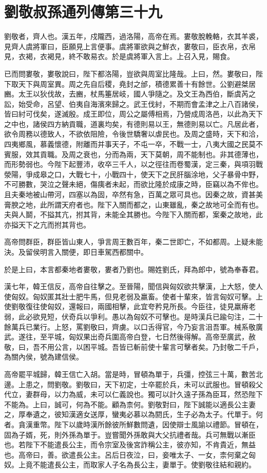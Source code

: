 \chapter{劉敬叔孫通列傳第三十九}

劉敬者，齊人也。漢五年，戍隴西，過洛陽，高帝在焉。婁敬脫輓輅，衣其羊裘，見齊人虞將軍曰，臣願見上言便事。虞將軍欲與之鮮衣，婁敬曰，臣衣帛，衣帛見，衣褐，衣褐見，終不敢易衣。於是虞將軍入言上。上召入見，賜食。

已而問婁敬，婁敬說曰，陛下都洛陽，豈欲與周室比隆哉。上曰，然。婁敬曰，陛下取天下與周室異。周之先自后稷，堯封之邰，積德累善十有餘世。公劉避桀居豳。太王以狄伐故，去豳，杖馬箠居岐，國人爭隨之。及文王為西伯，斷虞芮之訟，始受命，呂望、伯夷自海濱來歸之。武王伐紂，不期而會孟津之上八百諸侯，皆曰紂可伐矣，遂滅殷。成王即位，周公之屬傅相焉，乃營成周洛邑，以此為天下之中也，諸侯四方納貢職，道裏均矣，有德則易以王，無德則易以亡。凡居此者，欲令周務以德致人，不欲依阻險，令後世驕奢以虐民也。及周之盛時，天下和洽，四夷鄉風，慕義懷德，附離而并事天子，不屯一卒，不戰一士，八夷大國之民莫不賓服，效其貢職。及周之衰也，分而為兩，天下莫朝，周不能制也。非其德薄也，而形勢弱也。今陛下起豐沛，收卒三千人，以之徑往而卷蜀漢，定三秦，與項羽戰滎陽，爭成皋之口，大戰七十，小戰四十，使天下之民肝腦涂地，父子暴骨中野，不可勝數，哭泣之聲未絕，傷痍者未起，而欲比隆於成康之時，臣竊以為不侔也。且夫秦地被山帶河，四塞以為固，卒然有急，百萬之眾可具也。因秦之故，資甚美膏腴之地，此所謂天府者也。陛下入關而都之，山東雖亂，秦之故地可全而有也。夫與人鬬，不搤其亢，拊其背，未能全其勝也。今陛下入關而都，案秦之故地，此亦搤天下之亢而拊其背也。

高帝問群臣，群臣皆山東人，爭言周王數百年，秦二世即亡，不如都周。上疑未能決。及留侯明言入關便，即日車駕西都關中。

於是上曰，本言都秦地者婁敬，婁者乃劉也。賜姓劉氏，拜為郎中，號為奉春君。

漢七年，韓王信反，高帝自往擊之。至晉陽，聞信與匈奴欲共擊漢，上大怒，使人使匈奴。匈奴匿其壯士肥牛馬，但見老弱及羸畜。使者十輩來，皆言匈奴可擊。上使劉敬復往使匈奴，還報曰，兩國相擊，此宜夸矜見所長。今臣往，徒見羸瘠老弱，此必欲見短，伏奇兵以爭利。愚以為匈奴不可擊也。是時漢兵已踰句注，二十餘萬兵已業行。上怒，罵劉敬曰，齊虜。以口舌得官，今乃妄言沮吾軍。械系敬廣武。遂往，至平城，匈奴果出奇兵圍高帝白登，七日然後得解。高帝至廣武，赦敬，曰，吾不用公言，以困平城。吾皆已斬前使十輩言可擊者矣。乃封敬二千戶，為關內侯，號為建信侯。

高帝罷平城歸，韓王信亡入胡。當是時，冒頓為單于，兵彊，控弦三十萬，數苦北邊。上患之，問劉敬。劉敬曰，天下初定，士卒罷於兵，未可以武服也。冒頓殺父代立，妻群母，以力為威，未可以仁義說也。獨可以計久遠子孫為臣耳，然恐陛下不能為。上曰，誠可，何為不能。顧為柰何。劉敬對曰，陛下誠能以適長公主妻之，厚奉遺之，彼知漢適女送厚，蠻夷必慕以為閼氏，生子必為太子。代單于。何者。貪漢重幣。陛下以歲時漢所餘彼所鮮數問遺，因使辯士風諭以禮節。冒頓在，固為子婿，死，則外孫為單于。豈嘗聞外孫敢與大父抗禮者哉。兵可無戰以漸臣也。若陛下不能遣長公主，而令宗室及後宮詐稱公主，彼亦知，不肯貴近，無益也。高帝曰，善。欲遣長公主。呂后日夜泣，曰，妾唯太子、一女，柰何棄之匈奴。上竟不能遣長公主，而取家人子名為長公主，妻單于。使劉敬往結和親約。

